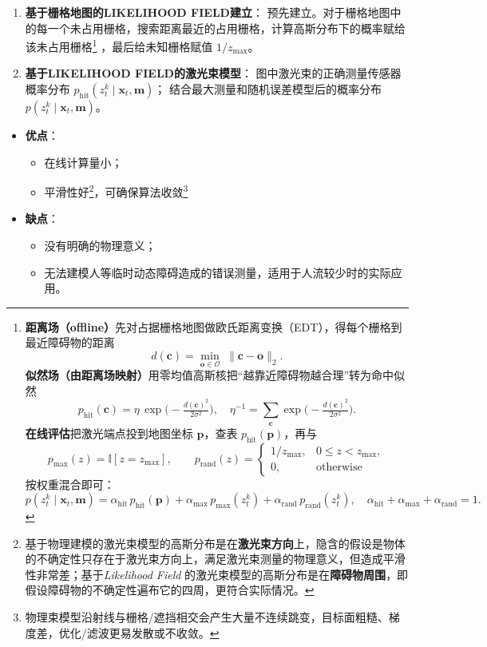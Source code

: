 \documentclass[../main.tex]{subfiles}
\begin{document}
\begin{enumerate}
\begin{itemize}
\begin{enumerate}
    
      \item \textbf{基于栅格地图的\;LIKELIHOOD FIELD\;建立}：
      预先建立。对于栅格地图中的每一个未占用栅格，搜索距离最近的占用栅格，计算高斯分布下的概率赋给该未占用栅格\footnote{%
\textbf{距离场（offline）}\;先对占据栅格地图做欧氏距离变换（EDT），得每个栅格到最近障碍物的距离
\[
d(\mathbf{c})=\min_{\mathbf{o}\in\mathcal{O}}\;\lVert \mathbf{c}-\mathbf{o}\rVert_2 .
\]
\textbf{似然场（由距离场映射）}\;用零均值高斯核把“越靠近障碍物越合理”转为命中似然
\[
p_{\mathrm{hit}}(\mathbf{c})=\eta\,\exp\!\Big(-\tfrac{d(\mathbf{c})^2}{2\sigma^2}\Big),
\quad
\eta^{-1}=\!\!\sum_{\mathbf{c}}\exp\!\Big(-\tfrac{d(\mathbf{c})^2}{2\sigma^2}\Big).
\]
\textbf{在线评估}\;把激光端点投到地图坐标 $\mathbf{p}$，查表 $p_{\mathrm{hit}}(\mathbf{p})$，再与
\[
p_{\mathrm{max}}(z)=\mathbb{I}[z=z_{\max}],\qquad
p_{\mathrm{rand}}(z)=\begin{cases}1/z_{\max},&0\le z<z_{\max},\\[2pt]0,&\text{otherwise}\end{cases}
\]
按权重混合即可：
\[
p\!\left(z_t^{k}\mid \mathbf{x}_t,\mathbf{m}\right)=
\alpha_{\mathrm{hit}}\,p_{\mathrm{hit}}(\mathbf{p})
+\alpha_{\mathrm{max}}\,p_{\mathrm{max}}(z_t^{k})
+\alpha_{\mathrm{rand}}\,p_{\mathrm{rand}}(z_t^{k}),
\quad \alpha_{\mathrm{hit}}+\alpha_{\mathrm{max}}+\alpha_{\mathrm{rand}}=1.
\]
}%
，最后给未知栅格赋值 $1/z_{\max}$。
    
      \item \textbf{基于\;LIKELIHOOD FIELD\;的激光束模型}：
      图中激光束的正确测量传感器概率分布 $p_{\mathrm{hit}}\!\left(z_t^{k}\mid \mathbf{x}_t,\mathbf{m}\right)$；
      结合最大测量和随机误差模型后的概率分布
      $p\!\left(z_t^{k}\mid \mathbf{x}_t,\mathbf{m}\right)$。

    \end{enumerate}
\end{itemize}
    \begin{itemize}
        \item \textbf{优点}：
        \begin{itemize}
            \item 在线计算量小；
            \item 平滑性好\footnote{基于物理建模的激光束模型的高斯分布是在\textbf{激光束方向}上，隐含的假设是物体的不确定性只存在于激光束方向上，满足激光束测量的物理意义，但造成平滑性非常差；基于\emph{Likelihood Field} 的激光束模型的高斯分布是在\textbf{障碍物周围}，即假设障碍物的不确定性遍布它的四周，更符合实际情况。}，可确保算法收敛\footnote{物理束模型沿射线与栅格/遮挡相交会产生大量不连续跳变，目标面粗糙、梯度差，优化/滤波更易发散或不收敛。}
        \end{itemize}
        \item \textbf{缺点}：
        \begin{itemize}
            \item 没有明确的物理意义；
            \item 无法建模人等临时动态障碍造成的错误测量，适用于人流较少时的实际应用。
        \end{itemize}
          

\end{itemize}
\end{enumerate}
\end{document}
